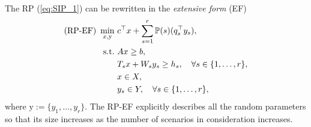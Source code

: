 The RP (\ref{eq:SIP_1}) can be rewritten in the \textit{extensive form} (EF)
\begin{subequations}\label{sip:ef}
\begin{align}
\textrm{(RP-EF) }\min_{x,\mathrm{y}}\ &c^{\top}x + \sum_{s=1}^{r}\operatorname*{\mathbb{P}}(s) (q_s^{\top}y_s), \label{ef:obj}\\ 
\mathrm{s.t.}\ &Ax\ge b,  \label{ef:b}\\
	&T_s x+W_s y_s\ge h_s,\quad\forall s\in\{1,\ldots,r\}, \label{ef:c} \\
	&x\in X, \label{ef:d} \\
	&y_s \in Y,\quad\forall s\in\{1,\ldots,r\}, \label{ef:e}
\end{align}
\end{subequations}
where $\mathrm{y}:=\{y_1,\ldots,y_r\}$. The RP-EF explicitly describes all the random parameters so that its size increases as the number of scenarios in consideration increases.
